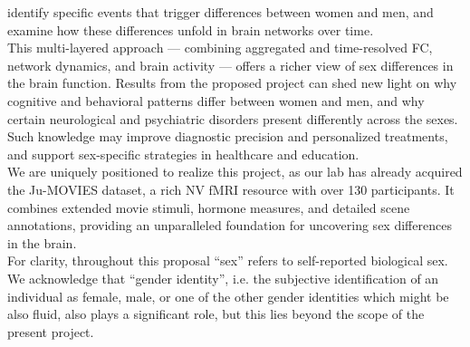 \documentclass[11pt,a4paper]{article}
\begin{document}
identify specific events that trigger differences between women and men, and examine how these differences 
unfold in brain networks over time.\\
This multi-layered approach — combining aggregated and time-resolved FC, network dynamics, and brain activity — offers 
a richer view of sex differences in the brain function. 
Results from the proposed project can shed new light on why cognitive and behavioral patterns differ 
between women and men, and why certain neurological and psychiatric disorders present differently across the sexes. 
Such knowledge may improve diagnostic precision and personalized treatments, and support sex-specific 
strategies in healthcare and education.\\
We are uniquely positioned to realize this project, as our lab has already acquired the Ju-MOVIES dataset, 
a rich NV fMRI resource with over 130 participants. It combines extended movie stimuli, 
hormone measures, and detailed scene annotations, providing an unparalleled foundation for 
uncovering sex differences in the brain.\\
For clarity, throughout this proposal “sex” refers to self-reported biological sex. 
We acknowledge that “gender identity”, i.e. the 
subjective identification of an individual as female, male, or one of the other gender identities which might 
be also fluid, also plays a significant role, but this lies 
beyond the scope of the present project.
\end{document}
